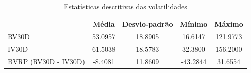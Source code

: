 \begin{table}
\caption{Estatísticas descritivas das volatilidades}
\label{tab:estatisticas_vols}
\begin{tabular}{lcccc}
\toprule
 & Média & Desvio-padrão & Mínimo & Máximo \\
\midrule
RV30D & 53.0957 & 18.8905 & 16.6147 & 121.9773 \\
IV30D & 61.5038 & 18.5783 & 32.3800 & 156.2000 \\
BVRP (RV30D - IV30D) & -8.4081 & 11.8609 & -43.2844 & 31.6554 \\
\bottomrule
\end{tabular}
\end{table}
